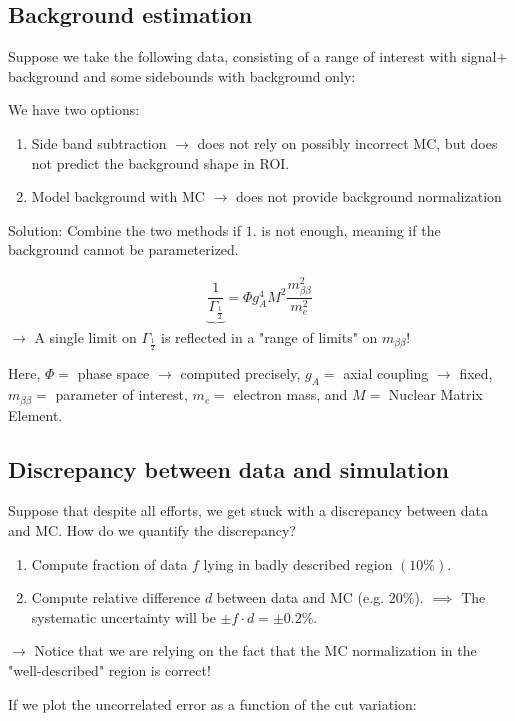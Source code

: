 \subsection{Background estimation}
Suppose we take the following data, consisting of a range of interest with signal$+$background and some sidebounds with background only:

We have two options:
\begin{enumerate}
  \item Side band subtraction $\to$ does not rely on possibly incorrect MC, but does not predict the background shape in ROI.
  \item Model background with MC $\to$ does not provide background normalization
\end{enumerate}

Solution: Combine the two methods if $1.$ is not enough, meaning if the background cannot be parameterized. 

\begin{align}
  {\underbrace{\dfrac{1}{\Gamma_{\frac{1}{2}}}}}= \Phi g_A^4 M^2 \dfrac{m_{\beta\beta}^2}{m_e^2}
\end{align}
$\to$ A single limit on $\Gamma_{\frac{1}{2}}$ is reflected in a "range of limits" on $m_{\beta\beta}$!

Here, $\Phi=$ phase space $\to$ computed precisely, $g_A = $ axial coupling $\to$ fixed, $m_{\beta\beta}=$ parameter of interest, $m_e=$ electron mass, and $M=$ Nuclear Matrix Element. 

\subsection{Discrepancy between data and simulation}
Suppose that despite all efforts, we get stuck with a discrepancy between data and MC. How do we quantify the discrepancy?

\begin{enumerate}
  \item Compute fraction of data $f$ lying in badly described region $(10\%)$.
  \item Compute relative difference $d$ between data and MC (e.g. $20\%$).
    $\implies$ The systematic uncertainty will be $\pm f\cdot d = \pm 0.2\%$. 
\end{enumerate}

$\to$ Notice that we are relying on the fact that the MC normalization in the "well-described" region is correct!

If we plot the uncorrelated error as a function of the cut variation:

